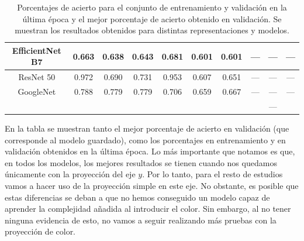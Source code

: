 \documentclass[a4paper,12pt,oneside,titlepage]{book}
\begin{document}
\begin{table}[h!]
{\begin{tabular}{cccccccccc}
  \multicolumn{1}{|c|}{EfficientNet B7}          & \multicolumn{1}{c|}{0.663} & \multicolumn{1}{c|}{0.638} & \multicolumn{1}{c|}{0.643}      & \multicolumn{1}{c|}{0.681} & \multicolumn{1}{c|}{0.601} & \multicolumn{1}{c|}{0.601}      & \multicolumn{1}{c|}{---}       & \multicolumn{1}{c|}{---}      & \multicolumn{1}{c|}{---}             \\ \hline
  \multicolumn{1}{|c|}{ResNet 50}                & \multicolumn{1}{c|}{0.972} & \multicolumn{1}{c|}{0.690} & \multicolumn{1}{c|}{0.731}      & \multicolumn{1}{c|}{0.953} & \multicolumn{1}{c|}{0.607} & \multicolumn{1}{c|}{0.651}      & \multicolumn{1}{c|}{---}       & \multicolumn{1}{c|}{---}      & \multicolumn{1}{c|}{---}             \\ \hline
  \multicolumn{1}{|c|}{GoogleNet}                & \multicolumn{1}{c|}{0.788} & \multicolumn{1}{c|}{0.779} & \multicolumn{1}{c|}{0.779}      & \multicolumn{1}{c|}{0.706} & \multicolumn{1}{c|}{0.659} & \multicolumn{1}{c|}{0.667}      & \multicolumn{1}{c|}{---}       & \multicolumn{1}{c|}{---}      & \multicolumn{1}{c|}{---}             \\ \hline
  \multicolumn{1}{l}{}                           & \multicolumn{1}{l}{}       & \multicolumn{1}{l}{}       & \multicolumn{1}{l}{}            & \multicolumn{1}{l}{}       & \multicolumn{1}{l}{}       & \multicolumn{1}{l}{}            & \multicolumn{1}{l}{}           & ---                           & \multicolumn{1}{l}{}                
  \end{tabular}
  }
  \caption{Porcentajes de acierto para el conjunto de entrenamiento y validación en la última época y el mejor porcentaje de acierto obtenido en validación. Se muestran los resultados obtenidos para distintas representaciones y modelos.}
  \label{tab:estudio_repre}
\end{table}

En la tabla se muestran tanto el mejor porcentaje de acierto en validación (que corresponde al modelo guardado), como los porcentajes en entrenamiento y en validación obtenidos en la última época. Lo más importante que notamos es que, en todos los modelos, los mejores resultados se tienen cuando nos quedamos únicamente con la proyección del eje $y$. Por lo tanto, para el resto de estudios vamos a hacer uso de la proyección simple en este eje. No obstante, es posible que estas diferencias se deban a que no hemos conseguido un modelo capaz de aprender la complejidad añadida al introducir el color. Sin embargo, al no tener ninguna evidencia de esto, no vamos a seguir realizando más pruebas con la proyección de color.  
 
\end{document}
